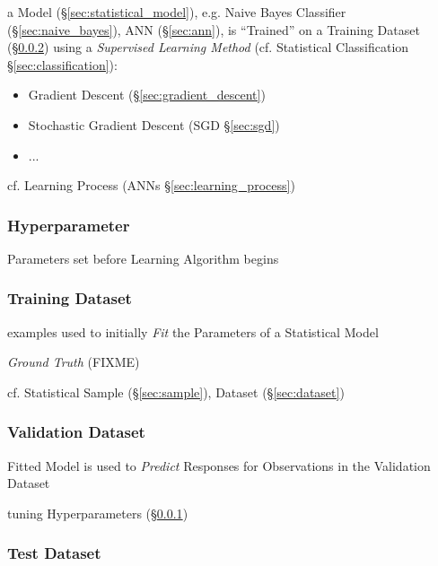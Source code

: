 a Model (\S\ref{sec:statistical_model}), e.g. Naive Bayes Classifier
(\S\ref{sec:naive_bayes}), ANN (\S\ref{sec:ann}), is ``Trained'' on a Training
Dataset (\S\ref{sec:training_dataset}) using a \emph{Supervised Learning Method}
(cf. Statistical Classification \S\ref{sec:classification}):
\begin{itemize}
  \item Gradient Descent (\S\ref{sec:gradient_descent})
  \item Stochastic Gradient Descent (SGD \S\ref{sec:sgd})
  \item ...
\end{itemize}

\fist cf. Learning Process (ANNs \S\ref{sec:learning_process})



\subsubsection{Hyperparameter}\label{sec:hyperparameter}

Parameters set before Learning Algorithm begins



\subsubsection{Training Dataset}\label{sec:training_dataset}

examples used to initially \emph{Fit} the Parameters of a Statistical Model

\emph{Ground Truth} (FIXME)

cf. Statistical Sample (\S\ref{sec:sample}), Dataset (\S\ref{sec:dataset})



\subsubsection{Validation Dataset}\label{sec:validation_dataset}

Fitted Model is used to \emph{Predict} Responses for Observations in the
Validation Dataset

tuning Hyperparameters (\S\ref{sec:hyperparameter})



\subsubsection{Test Dataset}\label{sec:test_dataset}

